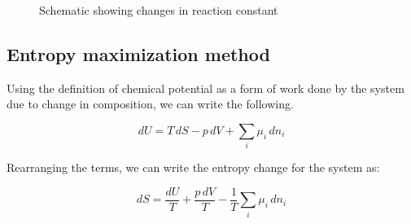 \begin{figure}[h]
\begin{center}
\end{center}
\caption{Schematic showing changes in reaction constant}
\label{kchange}
\end{figure}

\subsection{Entropy maximization method}

Using the definition of chemical potential as a form of work done by the system due to change in composition, we can write the following.

\begin{equation} dU = T \, dS - p \, dV + \sum_{i}{ \mu_i \, dn_i} \end{equation}

Rearranging the terms, we can write the entropy change for the system as:

\begin{equation} dS = \frac{dU}{T} + \frac{p \, dV}{T} - \frac{1}{T} \sum_{i}{ \mu_i \, dn_i} \end{equation}


